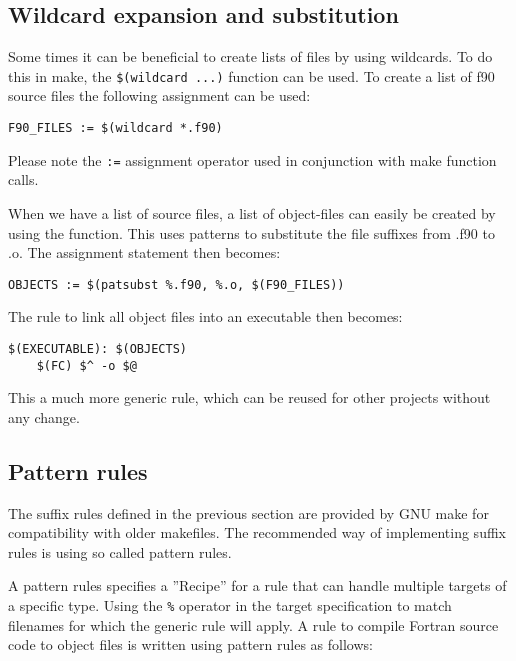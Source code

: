 \subsection{Wildcard expansion and substitution}

Some times it can be beneficial to create lists of files by using wildcards. To do this in make, the \verb+$(wildcard ...)+ function can be used. To create a list of f90 source files the following assignment can be used:

\mmode

\begin{lstlisting}
F90_FILES := $(wildcard *.f90)
\end{lstlisting}

Please note the \verb+:=+ assignment operator used in conjunction with make function calls. 

When we have a list of source files, a list of object-files can easily be created by using the  function. This uses patterns to substitute the file suffixes from .f90 to .o. The assignment statement then becomes:

\begin{lstlisting}
OBJECTS := $(patsubst %.f90, %.o, $(F90_FILES))
\end{lstlisting}

The rule to link all object files into an executable then becomes:

\begin{lstlisting}
$(EXECUTABLE): $(OBJECTS)
	$(FC) $^ -o $@
\end{lstlisting}

This a much more generic rule, which can be reused for other projects without any change.

\subsection{Pattern rules}

The suffix rules defined in the previous section are provided by GNU make for compatibility with older makefiles. The recommended way of implementing suffix rules is using so called pattern rules.

A pattern rules specifies a ''Recipe'' for a rule that can handle multiple targets of a specific type. Using the \verb+%+ operator in the target specification to match filenames for which the generic rule will apply. A rule to compile Fortran source code to object files is written using pattern rules as follows:

